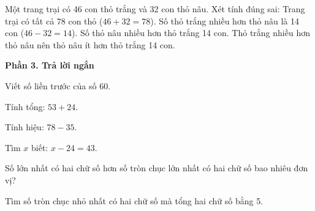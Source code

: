 \begin{ex} %
Một trang trại có 46 con thỏ trắng và 32 con thỏ nâu. Xét tính đúng sai:
\choiceTF
{\True Trang trại có tất cả 78 con thỏ ($46 + 32 = 78$).}
{\True Số thỏ trắng nhiều hơn thỏ nâu là 14 con ($46 - 32 = 14$).}
{Số thỏ nâu nhiều hơn thỏ trắng 14 con.}
{\True Thỏ trắng nhiều hơn thỏ nâu nên thỏ nâu ít hơn thỏ trắng 14 con.}
\end{ex}

\textbf{Phần 3. Trả lời ngắn}

\begin{ex} %
Viết số liền trước của số $60$.
\end{ex}

\begin{ex} %
Tính tổng: $53 + 24$.
\end{ex}

\begin{ex} %
Tính hiệu: $78 - 35$.
\end{ex}

\begin{ex} %
Tìm $x$ biết: $x - 24 = 43$.
\end{ex}

\begin{ex} %
Số lớn nhất có hai chữ số hơn số tròn chục lớn nhất có hai chữ số bao nhiêu đơn vị?
\end{ex}

\begin{ex} %
Tìm số tròn chục nhỏ nhất có hai chữ số mà tổng hai chữ số bằng 5.
\end{ex}
